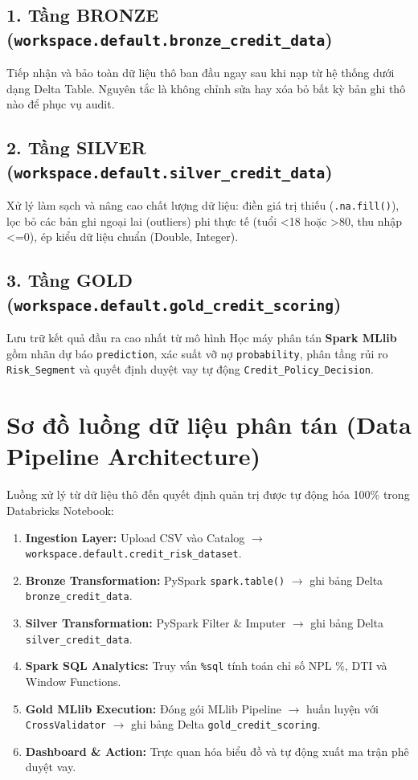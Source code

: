 \subsection{1. Tầng BRONZE (\texttt{workspace.default.bronze\_credit\_data})}
Tiếp nhận và bảo toàn dữ liệu thô ban đầu ngay sau khi nạp từ hệ thống dưới dạng Delta Table. Nguyên tắc là không chỉnh sửa hay xóa bỏ bất kỳ bản ghi thô nào để phục vụ audit.

\subsection{2. Tầng SILVER (\texttt{workspace.default.silver\_credit\_data})}
Xử lý làm sạch và nâng cao chất lượng dữ liệu: điền giá trị thiếu (\texttt{.na.fill()}), lọc bỏ các bản ghi ngoại lai (outliers) phi thực tế (tuổi <18 hoặc >80, thu nhập <=0), ép kiểu dữ liệu chuẩn (Double, Integer).

\subsection{3. Tầng GOLD (\texttt{workspace.default.gold\_credit\_scoring})}
Lưu trữ kết quả đầu ra cao nhất từ mô hình Học máy phân tán \textbf{Spark MLlib} gồm nhãn dự báo \texttt{prediction}, xác suất vỡ nợ \texttt{probability}, phân tầng rủi ro \texttt{Risk\_Segment} và quyết định duyệt vay tự động \texttt{Credit\_Policy\_Decision}.

\section{Sơ đồ luồng dữ liệu phân tán (Data Pipeline Architecture)}
Luồng xử lý từ dữ liệu thô đến quyết định quản trị được tự động hóa 100\% trong Databricks Notebook:
\begin{enumerate}
    \item \textbf{Ingestion Layer:} Upload CSV vào Catalog $\rightarrow$ \texttt{workspace.default.credit\_risk\_dataset}.
    \item \textbf{Bronze Transformation:} PySpark \texttt{spark.table()} $\rightarrow$ ghi bảng Delta \texttt{bronze\_credit\_data}.
    \item \textbf{Silver Transformation:} PySpark Filter \& Imputer $\rightarrow$ ghi bảng Delta \texttt{silver\_credit\_data}.
    \item \textbf{Spark SQL Analytics:} Truy vấn \texttt{\%sql} tính toán chỉ số NPL \%, DTI và Window Functions.
    \item \textbf{Gold MLlib Execution:} Đóng gói MLlib Pipeline $\rightarrow$ huấn luyện với \texttt{CrossValidator} $\rightarrow$ ghi bảng Delta \texttt{gold\_credit\_scoring}.
    \item \textbf{Dashboard \& Action:} Trực quan hóa biểu đồ và tự động xuất ma trận phê duyệt vay.
\end{enumerate}
\newpage
